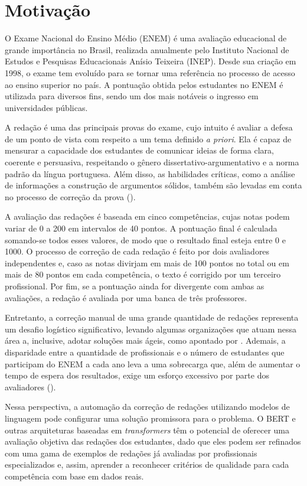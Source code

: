 \section{Motivação}

O Exame Nacional do Ensino Médio (ENEM) é uma avaliação educacional de grande importância no Brasil, realizada anualmente pelo Instituto Nacional de Estudos e Pesquisas Educacionais Anísio Teixeira (INEP). Desde sua criação em 1998, o exame tem evoluído para se tornar uma referência no processo de acesso ao ensino superior no país. A pontuação obtida pelos estudantes no ENEM é utilizada para diversos fins, sendo um dos mais notáveis o ingresso em universidades públicas.

A redação é uma das principais provas do exame, cujo intuito é avaliar a defesa de um ponto de vista com respeito a um tema definido \textit{a priori}. Ela é capaz de mensurar a capacidade dos estudantes de comunicar ideias de forma clara, coerente e persuasiva, respeitando o gênero dissertativo-argumentativo e a norma padrão da língua portuguesa. Além disso, as habilidades críticas, como a análise de informações a construção de argumentos sólidos, também são levadas em conta no processo de correção da prova (\cite{cartilha-redacao}).

A avaliação das redações é baseada em cinco competências, cujas notas podem variar de 0 a 200 em intervalos de 40 pontos. A pontuação final é calculada somando-se todos esses valores, de modo que o resultado final esteja entre 0 e 1000. O processo de correção de cada redação é feito por dois avaliadores independentes e, caso as notas divirjam em mais de 100 pontos no total ou em mais de 80 pontos em cada competência, o texto é corrigido por um terceiro profissional. Por fim, se a pontuação ainda for divergente com ambas as avaliações, a redação é avaliada por uma banca de três professores.

Entretanto, a correção manual de uma grande quantidade de redações representa um desafio logístico significativo, levando algumas organizações que atuam nessa área a, inclusive, adotar soluções mais ágeis, como apontado por \cite{taghipour-ng-2016-neural}. Ademais, a disparidade entre a quantidade de profissionais e o número de estudantes que participam do ENEM a cada ano leva a uma sobrecarga que, além de aumentar o tempo de espera dos resultados, exige um esforço excessivo por parte dos avaliadores (\cite{lesme-20-redacoes-noticia}).

Nessa perspectiva, a automação da correção de redações utilizando modelos de linguagem pode configurar uma solução promissora para o problema. O BERT e outras arquiteturas baseadas em \textit{transformers} têm o potencial de oferecer uma avaliação objetiva das redações dos estudantes, dado que eles podem ser refinados com uma gama de exemplos de redações já avaliadas por profissionais especializados e, assim, aprender a reconhecer critérios de qualidade para cada competência com base em dados reais.

